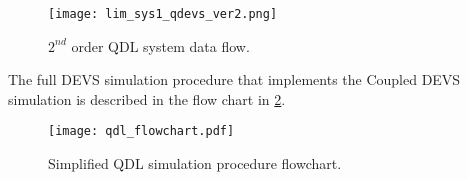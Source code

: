 \begin{figure}[htb]
    \centering
    \texttt{[image: lim\_sys1\_qdevs\_ver2.png]}
    \caption{$2^{nd}$ order QDL system data flow.}
    \label{fig:lim_sys1_qdevs}
\end{figure}

The full DEVS simulation procedure that implements the Coupled DEVS simulation is described in the flow chart in \ref{fig:qdl_flowchart}.

\begin{figure}[htb]
    \centering
    \texttt{[image: qdl\_flowchart.pdf]}
    \caption{Simplified QDL simulation procedure flowchart.}
    \label{fig:qdl_flowchart}
\end{figure}
